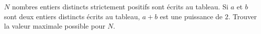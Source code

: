 $N$ nombres entiers distincts strictement positifs sont écrits au tableau. Si $a$ et $b$ sont deux entiers distincts écrits au tableau, $a+b$ est une puissance de $2$. Trouver la valeur maximale possible pour $N$.